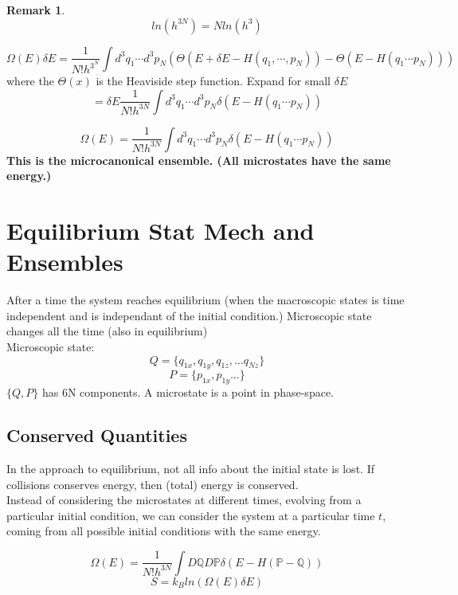 \documentclass[11pt]{book}
\theoremstyle{definition}
\newtheorem{remark}{Remark}[section]
\begin{document}
\begin{remark}
	\[ ln(h^{3N}) = Nln(h^{3}) \] 
\end{remark}

\begin{equation}
	\Omega(E)\delta E = \frac{1}{N!h^{3^{N}}} \int d^3 q_1 \cdots d^3 p_N (\Theta(E+\delta E -H(q_1, \cdots, p_N) ) -\Theta (E-H(q_1 \cdots p_N))) 
\end{equation}
where the $ \Theta (x) $ is the Heaviside step function.
Expand for small $ \delta E $ 
\[ = \delta E \frac{1}{N!h^{3N}} \int d^3 q_1 \cdots d^3 p_N \delta (E- H(q_1 \cdots p_N)) \] 

\begin{shaded*}
\begin{equation}
	\Omega(E) = \frac{1}{N!h^{3N}} \int d^3 q_1 \cdots d^3 p_N \delta (E- H(q_1 \cdots p_N)) 
\end{equation}
\textbf{This is the microcanonical ensemble. (All microstates have the same energy.)} 
\end{shaded*}

\section{Equilibrium Stat Mech and Ensembles}
After a time the system reaches equilibrium (when the macroscopic states is time independent and is independant of the initial condition.)
Microscopic state changes all the time (also in equilibrium) \\
Microscopic state: 
$$ Q = \{q_{1x}, q_{1y}, q_{1z}, ... q_{Nz}\} $$
\[ P = \{p_{1x}, p_{1y} ...\}\] 
$ \{Q,P\} $ has 6N components.
A microstate is a point in phase-space.
\subsection{Conserved Quantities}
In the approach to equilibrium, not all info about the initial state is lost. If collisions conserves energy, then (total) energy is conserved. \\
Instead of considering the microstates at different times, evolving from a particular initial condition, we can consider the system at a particular time $ t $, coming from all possible initial conditions with the same energy.

\[ \Omega(E) = \frac{1}{N!h^{3N}} \int D\mathbb{Q} D\mathbb{P} \delta(E - H(\mathbb{P} - \mathbb{Q}))\] 
\begin{equation}
	S = k_B ln(\Omega(E)\delta E)
\end{equation}
\end{document}

